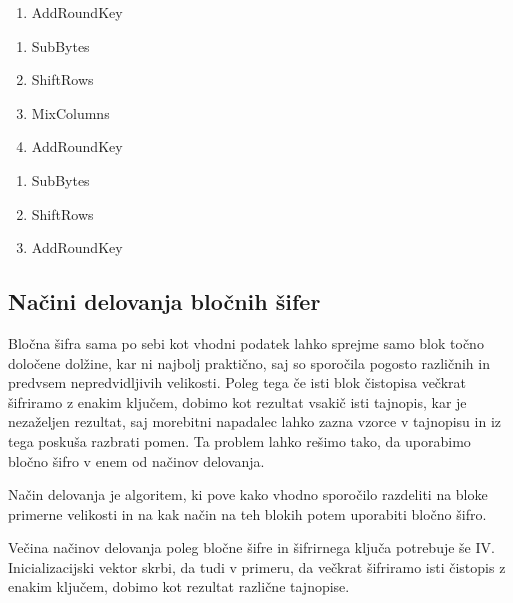 \documentclass[12pt,a4paper,openany]{book}
\begin{document}
\begin{description}[style=nextline]
	\item[KeyExpansions]

	\item[Prvi krog]
		\begin{enumerate}
			\item AddRoundKey
		\end{enumerate}
	\item[Vmesni krogi]
		\begin{enumerate}
			\item SubBytes
			\item ShiftRows
			\item MixColumns
			\item AddRoundKey
		\end{enumerate}

	\item[Zadnji krogi]
		\begin{enumerate}
			\item SubBytes
			\item ShiftRows
			\item AddRoundKey
		\end{enumerate}

\end{description}



\subsection{Načini delovanja bločnih šifer}

Bločna šifra sama po sebi kot vhodni podatek lahko sprejme samo blok točno določene dolžine, kar ni najbolj praktično, saj so sporočila pogosto različnih in predvsem nepredvidljivih velikosti. Poleg tega če isti blok čistopisa večkrat šifriramo z enakim ključem, dobimo kot rezultat vsakič isti tajnopis, kar je nezaželjen rezultat, saj morebitni napadalec lahko zazna vzorce v tajnopisu in iz tega poskuša razbrati pomen. Ta problem lahko rešimo tako, da uporabimo bločno šifro v enem od načinov delovanja.

Način delovanja je algoritem, ki pove kako vhodno sporočilo razdeliti na bloke primerne velikosti in na kak način na teh blokih potem uporabiti bločno šifro.

Večina načinov delovanja poleg bločne šifre in šifrirnega ključa potrebuje še \gls{IV}. Inicializacijski vektor skrbi, da tudi v primeru, da večkrat šifriramo isti čistopis z enakim ključem, dobimo kot rezultat različne tajnopise.
\end{document}
